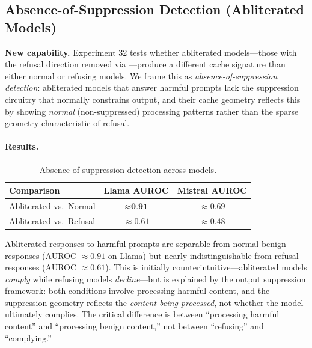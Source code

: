 \subsection{Absence-of-Suppression Detection (Abliterated Models)}
\label{sec:jailbreak}

\textbf{New capability.} Experiment 32 tests whether abliterated models---those with the refusal direction removed via \citet{arditi2024refusal}---produce a different cache signature than either normal or refusing models. We frame this as \emph{absence-of-suppression detection}: abliterated models that answer harmful prompts lack the suppression circuitry that normally constrains output, and their cache geometry reflects this by showing \emph{normal} (non-suppressed) processing patterns rather than the sparse geometry characteristic of refusal.

\paragraph{Results.}

\begin{table}[H]
\centering
\caption{Absence-of-suppression detection across models.}
\label{tab:jailbreak}
\begin{tabular}{lcc}
\toprule
\textbf{Comparison} & \textbf{Llama AUROC} & \textbf{Mistral AUROC} \\
\midrule
Abliterated vs.\ Normal & $\approx \textbf{0.91}$ & $\approx 0.69$ \\
Abliterated vs.\ Refusal & $\approx 0.61$ & $\approx 0.48$ \\
\bottomrule
\end{tabular}
\end{table}

Abliterated responses to harmful prompts are separable from normal benign responses (AUROC $\approx 0.91$ on Llama) but nearly indistinguishable from refusal responses (AUROC $\approx 0.61$). This is initially counterintuitive---abliterated models \emph{comply} while refusing models \emph{decline}---but is explained by the output suppression framework: both conditions involve processing harmful content, and the suppression geometry reflects the \emph{content being processed}, not whether the model ultimately complies. The critical difference is between ``processing harmful content'' and ``processing benign content,'' not between ``refusing'' and ``complying.''

